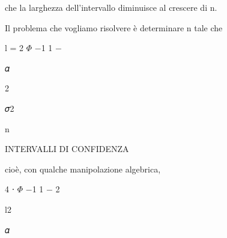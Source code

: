 \documentclass[a4paper,portrait,12pt]{article}
\begin{document}
\begin{flushleft}
che la larghezza dell'intervallo diminuisce al crescere di n.
\end{flushleft}


\begin{flushleft}
Il problema che vogliamo risolvere \`{e} determinare n tale che
\end{flushleft}


\begin{flushleft}
l = 2 $\Phi$ $-$1 1 $-$
\end{flushleft}





\begin{flushleft}
𝛼
\end{flushleft}


2





\begin{flushleft}
𝜎2
\end{flushleft}


\begin{flushleft}
n
\end{flushleft}










\begin{flushleft}
INTERVALLI DI CONFIDENZA
\end{flushleft}





\begin{flushleft}
cio\`{e}, con qualche manipolazione algebrica,
\end{flushleft}


\begin{flushleft}
4 ⋅ $\Phi$ $-$1 1 $-$ 2
\end{flushleft}


\begin{flushleft}
l2
\end{flushleft}





\begin{flushleft}
𝛼
\end{flushleft}
\end{document}
